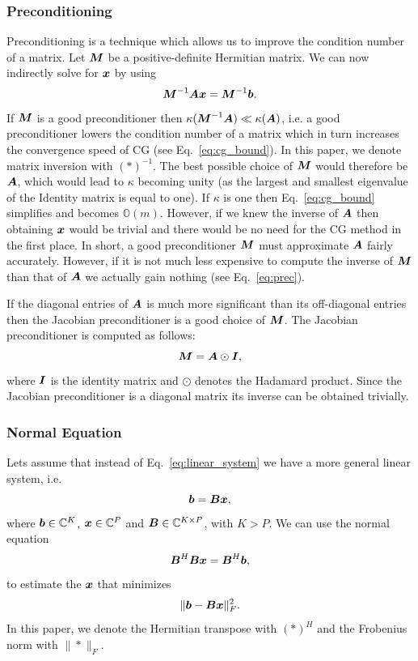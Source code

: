 \documentclass[useAMS,usenatbib]{mn2e}
\newcommand{\bA}{\bmath{A}}
\newcommand{\bB}{\bmath{B}}
\newcommand{\bM}{\bmath{M}}
\newcommand{\bI}{\bmath{I}}
\newcommand{\bb}{\bmath{b}}
\newcommand{\bx}{\bmath{x}}
\begin{document}
\subsubsection{Preconditioning}
\label{sec:precon}
Preconditioning is a technique which allows us to improve the condition number of a matrix. Let $\bM$ be a positive-definite Hermitian matrix.
We can now indirectly solve for $\bx$ by using 
\begin{equation}
\label{eq:prec}
\bM^{-1}\bA\bx = \bM^{-1}\bb.
\end{equation}
If $\bM$ is a good preconditioner then $\kappa(\bM^{-1}\bA) \ll \kappa(\bA)$, i.e. a good preconditioner lowers the condition number of a matrix which in turn increases the convergence speed 
of CG (see Eq.~\eqref{eq:cg_bound}). In this paper, we denote matrix inversion with $(*)^{-1}$. The best possible choice of $\bM$ would therefore be $\bA$, which would lead to $\kappa$ becoming unity (as the largest and smallest eigenvalue of the Identity matrix is equal to one).
If $\kappa$ is one then Eq.~\eqref{eq:cg_bound} simplifies and becomes $\mathbb{O}(m)$. However, if we knew the inverse of $\bA$ then obtaining $\bx$ would be trivial and there would be no need for the CG method in the first place. 
In short, a good preconditioner $\bM$ must approximate $\bA$ fairly accurately. However, if it is not much less expensive to 
compute the inverse of $\bM$ than that of $\bA$ we actually gain nothing (see Eq.~\eqref{eq:prec}).  

If the diagonal entries of $\bA$ is much more significant than its off-diagonal entries then the 
Jacobian preconditioner is a good choice of $\bM$. The Jacobian preconditioner is computed as follows:
\begin{equation}
\bM = \bA\odot\bI, 
\end{equation}
where $\bI$ is the identity matrix and $\odot$ denotes the Hadamard product. Since the Jacobian preconditioner is a diagonal matrix its inverse can be obtained trivially.

\subsubsection{Normal Equation}
\label{sec:normal}
Lets assume that instead of Eq.~\eqref{eq:linear_system} we have a more general linear system, i.e.
\begin{equation}
 \bb = \bB\bx,
\end{equation}
where $\bb\in\mathbb{C}^K$, $\bx\in\mathbb{C}^P$  and $\bB\in\mathbb{C}^{K \times P}$, with $K > P$. We can use the normal equation 
\begin{equation}
\label{eq:normal_equation}
\bB^H\bB\bx = \bB^H\bb, 
\end{equation}
to estimate the $\bx$ that minimizes
\begin{equation}
\label{eq:norm_ls}
\|\bb-\bB\bx\|_F^2. 
\end{equation}
In this paper, we denote the Hermitian transpose with $(*)^H$ and the Frobenius norm with $\|*\|_F$.
\end{document}
